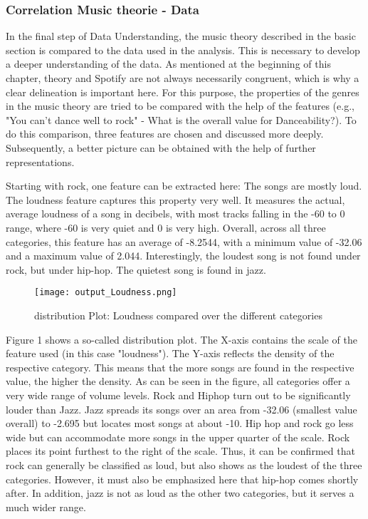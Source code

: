 \subsubsection{Correlation Music theorie - Data}
In the final step of Data Understanding,
the music theory described in the basic section is compared to the data used in the analysis.
This is necessary to develop a deeper understanding of the data.
As mentioned at the beginning of this chapter, theory and Spotify are not always necessarily congruent,
which is why a clear delineation is important here.
For this purpose, the properties of the genres in the music theory are tried to be compared
with the help of the features (e.g., "You can't dance well to rock" - What is the overall value for Danceability?).
To do this comparison, three features are chosen and discussed more deeply.
Subsequently, a better picture can be obtained with the help of further representations.

Starting with rock, one feature can be extracted here: The songs are mostly loud.
The loudness feature captures this property very well.
It measures the actual, average loudness of a song in decibels, with most tracks falling
in the -60 to 0 range, where -60 is very quiet and 0 is very high.
Overall, across all three categories, this feature has an average of -8.2544,
with a minimum value of -32.06 and a maximum value of 2.044.
Interestingly, the loudest song is not found under rock, but under hip-hop.
The quietest song is found in jazz. 

\begin{figure}[H]
    \centering
    \caption[]{distribution Plot: Loudness compared over the different categories}
	\label{fig:du_dp_loudness}
    \texttt{[image: output\_Loudness.png]}
\end{figure}

Figure 1  shows a so-called distribution plot.
The X-axis contains the scale of the feature used (in this case "loudness").
The Y-axis reflects the density of the respective category.
This means that the more songs are found in the respective value, the higher the density.
As can be seen in the figure, all categories offer a very wide range of volume levels.
Rock and Hiphop turn out to be significantly louder than Jazz.
Jazz spreads its songs over an area from -32.06 (smallest value overall) to -2.695 but locates
most songs at about -10. Hip hop and rock go less wide but can accommodate more songs in the upper
quarter of the scale. Rock places its point furthest to the right of the scale.
Thus, it can be confirmed that rock can generally be classified as loud,
but also shows as the loudest of the three categories.
However, it must also be emphasized here that hip-hop comes shortly after.
In addition, jazz is not as loud as the other two categories, but it serves a much wider range. 

